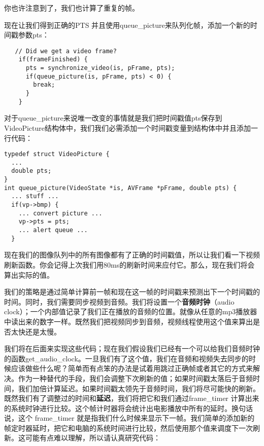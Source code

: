 你也许注意到了，我们也计算了重复的帧。

现在让我们得到正确的PTS 并且使用queue_picture来队列化帧，添加一个新的时间戳参数pts：

\begin{lstlisting}
   // Did we get a video frame?
    if(frameFinished) {
      pts = synchronize_video(is, pFrame, pts);
      if(queue_picture(is, pFrame, pts) < 0) {
        break;
      }
    }
\end{lstlisting}

对于queue_picture来说唯一改变的事情就是我们把时间戳值pts保存到VideoPicture结构体中，我们我们必需添加一个时间戳变量到结构体中并且添加一行代码：

\begin{lstlisting}
typedef struct VideoPicture {
  ...
  double pts;
}
int queue_picture(VideoState *is, AVFrame *pFrame, double pts) {
  ... stuff ...
  if(vp->bmp) {
    ... convert picture ...
    vp->pts = pts;
    ... alert queue ...
  }
\end{lstlisting}

现在我们的图像队列中的所有图像都有了正确的时间戳值，所以让我们看一下视频刷新函数。你会记得上次我们用80ms的刷新时间来应付它。那么，现在我们将会算出实际的值。

我们的策略是通过简单计算前一帧和现在这一帧的时间戳来预测出下一个时间戳的时间。同时，我们需要同步视频到音频。我们将设置一个\textbf{音频时钟}（audio clock）；一个内部值记录了我们正在播放的音频的位置。就像从任意的mp3播放器中读出来的数字一样。既然我们把视频同步到音频，视频线程使用这个值来算出是否太快还是太慢。

我们将在后面来实现这些代码；现在我们假设我们已经有一个可以给我们音频时钟的函数get_audio_clock。一旦我们有了这个值，我们在音频和视频失去同步的时候应该做些什么呢？简单而有点笨的办法是试着用跳过正确帧或者其它的方式来解决。作为一种替代的手段，我们会调整下次刷新的值；如果时间戳太落后于音频时间，我们加倍计算延迟。如果时间戳太领先于音频时间，我们将尽可能快的刷新。既然我们有了调整过的时间和\textbf{延迟}，我们将把它和我们通过frame_timer 计算出来的系统时钟进行比较。这个帧计时器将会统计出电影播放中所有的延时。换句话说，这个 frame_timer 就是指我们什么时候来显示下一帧。我们简单的添加新的帧定时器延时，把它和电脑的系统时间进行比较，然后使用那个值来调度下一次刷新。这可能有点难以理解，所以请认真研究代码：

